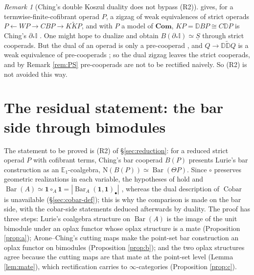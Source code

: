 \documentclass[11pt]{amsart}
\theoremstyle{definition}
\theoremstyle{remark}
\newtheorem{remark}[subsection]{Remark}
\newcommand{\Id}{\mathbb{I}}
\newcommand{\uS}{\underline{S}}
\newcommand{\Com}{\mathbf{Com}}
\newcommand{\dual}{\mathbb{D}}
\newcommand{\unit}{\mathbf{1}}
\newcommand{\BarC}{\operatorname{Bar}}
\newcommand{\Cobar}{\operatorname{Cobar}}
\newcommand{\Nfun}{\mathrm{N}}
\newcommand{\Th}{\Theta}
\begin{document}
\begin{remark}[Ching's double Koszul duality does not bypass (R2)]
\cite[Theorem 4.11]{Ch12} gives, for a termwise-finite-cofibrant operad $P$, a zigzag of weak equivalences of strict operads $P\leftarrow WP\to CBP\to K\tilde K P$, and with $P$ a model of $\Com$, $KP=\dual BP\cong C\dual P$ is Ching's $\partial_*\Id$ \cite[Lemma 4.5]{Ch12}. One might hope to dualize and obtain $B(\partial_*\Id)\simeq\uS$ through strict cooperads. But the dual of an operad is only a pre-cooperad \cite[Definition 4.4]{Ch12}, and $Q\to\dual\tilde{\dual}Q$ is a weak equivalence of pre-cooperads \cite[Lemma 4.9]{Ch12}; so the dual zigzag leaves the strict cooperads, and by Remark \ref{rem:PS} pre-cooperads are not to be rectified naively. So (R2) is not avoided this way.
\end{remark}

\section{The residual statement: the bar side through bimodules}\label{sec:F5}
The statement to be proved is (R2) of \S\ref{sec:reduction}: for a reduced strict operad $P$ with cofibrant terms, Ching's bar cooperad $B(P)$ presents Lurie's bar construction as an $\mathbb{E}_1$-coalgebra, $\Nfun(B(P))\simeq\BarC(\Th P)$. Since $\circ$ preserves geometric realizations in each variable, the hypotheses of \cite[Example 5.2.2.3]{HA} hold and $\BarC(A)\simeq\unit\circ_A\unit=|\BarC_A(\unit,\unit)_\bullet|$ \cite[Remark 5.2.2.8]{HA}, whereas the dual description of $\Cobar$ is unavailable (\S\ref{sec:cobar-def}); this is why the comparison is made on the bar side, with the cobar-side statements deduced afterwards by duality. The proof has three steps: Lurie's coalgebra structure on $\BarC(A)$ is the image of the unit bimodule under an oplax functor whose oplax structure is a mate (Proposition \ref{prop:a}); Arone--Ching's cutting maps make the point-set bar construction an oplax functor on bimodules (Proposition \ref{prop:b}); and the two oplax structures agree because the cutting maps are that mate at the point-set level (Lemma \ref{lem:mate}), which rectification carries to $\infty$-categories (Proposition \ref{prop:c}).
\end{document}
